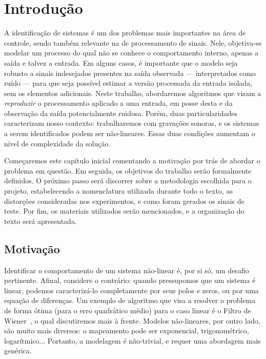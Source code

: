 \chapter{Introdução}
\label{chapter:intro}

A identificação de sistemas é um dos problemas mais importantes na área de controle,
sendo também relevante na de processamento de sinais. Nele, objetiva-se modelar um
processo do qual não se conhece o comportamento interno, apenas a saída e talvez a
entrada. Em alguns casos, é importante que o modelo seja robusto a sinais indesejados
presentes na saída observada --- interpretados como ruído --- para que seja possível
estimar a versão processada da entrada isolada, sem os elementos adicionais. Neste
trabalho, abordaremos algoritmos que visam a \emph{reproduzir} o processamento aplicado
a uma entrada, em posse desta e da observação da saída potencialmente ruidosa. Porém,
duas particularidades caracterizam nosso contexto: trabalharemos com gravações sonoras,
e os sistemas a serem identificados podem ser não-lineares. Essas duas condições
aumentam o nível de complexidade da solução.

Começaremos este capítulo inicial comentando a motivação por trás de abordar o problema
em questão. Em seguida, os objetivos do trabalho serão formalmente definidos. O próximo
passo será discorrer sobre a metodologia escolhida para o projeto, estabelecendo a
nomenclatura utilizada durante todo o texto, as distorções consideradas nos
experimentos, e como foram gerados os sinais de teste. Por fim, os materiais utilizados
serão mencionados, e a organização do texto será apresentada.

\section{Motivação}

Identificar o comportamento de um sistema não-linear é, por si só, um desafio
pertinente. Afinal, considere o contrário: quando pressupomos que um sistema é linear,
podemos caracterizá-lo completamente por seus polos e zeros, ou por uma equação de
diferenças. Um exemplo de algoritmo que visa a resolver o problema de forma ótima (para
o erro quadrático médio) para o caso linear é o Filtro de Wiener~\cite{hayes-1996}, o
qual discutiremos mais à frente. Modelos não-lineares, por outro lado, são muito mais
diversos: o mapeamento pode ser exponencial, trigonométrico, logarítmico... Portanto, a
modelagem é não-trivial, e requer uma abordagem mais genérica.

